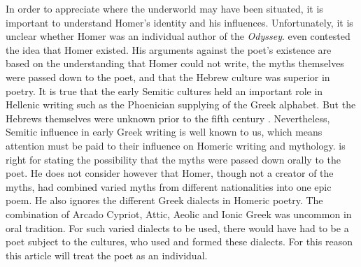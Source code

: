 In order to appreciate where the underworld may have been situated, it is important to understand Homer’s identity and his influences. Unfortunately, it is unclear whether Homer was an individual author of the \emph{Odyssey}. \textcite[xi–xii]{Parry1987} even contested the idea that Homer existed. His arguments against the poet’s existence are based on the understanding that Homer could not write, the myths themselves were passed down to the poet, and that the Hebrew culture was superior in poetry. It is true that the early Semitic cultures held an important role in Hellenic writing such as the Phoenician supplying of the Greek alphabet. But the Hebrews themselves were unknown prior to the fifth century \BC. Nevertheless, Semitic influence in early Greek writing is well known to us, which means attention must be paid to their influence on Homeric writing and mythology. \textcite{Parry1987} is right for stating the possibility that the myths were passed down orally to the poet. He does not consider however that Homer, though not a creator of the myths, had combined varied myths from different nationalities into one epic poem. He also ignores the different Greek dialects in Homeric poetry. The combination of Arcado Cypriot, Attic, Aeolic and Ionic Greek was uncommon in oral tradition. For such varied dialects to be used, there would have had to be a poet subject to the cultures, who used and formed these dialects.  For this reason this article will treat the poet as an individual.
	
